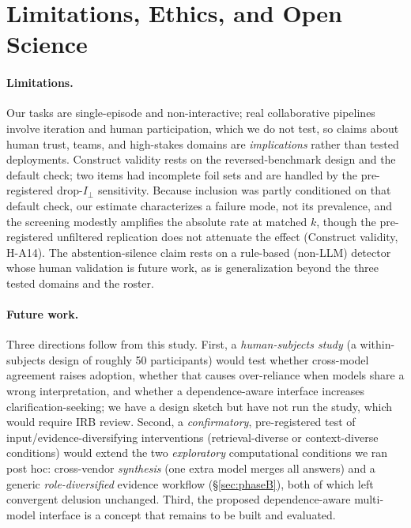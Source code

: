 \documentclass[acmsmall,screen,review,anonymous]{acmart}
\newcommand{\iperp}{\ensuremath{I_\perp}}
\begin{document}
\section{Limitations, Ethics, and Open Science}
\label{sec:limitations}
\paragraph{Limitations.} Our tasks are single-episode and non-interactive; real collaborative pipelines
involve iteration and human participation, which we do not test, so claims about human trust, teams, and
high-stakes domains are \emph{implications} rather than tested deployments. Construct validity rests on the
reversed-benchmark design and the default check; two items had incomplete foil sets and are handled by the
pre-registered drop-\iperp{} sensitivity. Because inclusion was partly conditioned on that default check, our
estimate characterizes a failure mode, not its prevalence, and the screening modestly amplifies the absolute
rate at matched $k$, though the pre-registered unfiltered replication does not attenuate the effect
(Construct validity, H-A14). The abstention-silence claim rests on a rule-based (non-LLM)
detector whose human validation is future work, as is generalization beyond the three tested domains and the
roster.
\paragraph{Future work.} Three directions follow from this study. First, a \emph{human-subjects study} (a
within-subjects design of roughly 50 participants) would test
whether cross-model agreement raises adoption, whether that causes over-reliance when models share a wrong
interpretation, and whether a dependence-aware interface increases clarification-seeking; we have a design
sketch but have not run the study, which would require IRB review. Second, a \emph{confirmatory},
pre-registered test of input/evidence-diversifying interventions (retrieval-diverse or context-diverse
conditions) would extend the two \emph{exploratory} computational conditions we ran post hoc: cross-vendor
\emph{synthesis} (one extra model merges all answers) and a generic \emph{role-diversified} evidence workflow
(\S\ref{sec:phaseB}), both of which left convergent delusion unchanged. Third, the proposed
dependence-aware multi-model interface is a concept that remains to be built and evaluated.
\end{document}
